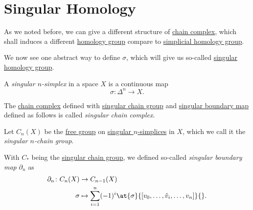 \section{Singular Homology}
As we noted before, we can give a different structure of \hyperref[def:chain-complex]{chain complex}, which shall induces a different \hyperref[def:homology-group]{homology group} compare to \hyperref[def:simplicial-homology-group]{simplicial homology group}.

We now see one abstract way to define \(\sigma \), which will give us so-called \hyperref[def:singular-homology-group]{singular homology group}.

\begin{definition}\label{def:singular-simplex}
	A \emph{singular \(n\)-simplex} in a space \(X\) is a continuous map
	\[
		\sigma \colon \Delta^n \to X.
	\]
\end{definition}

\begin{definition}\label{def:singular-chain-complex}
	The \hyperref[def:chain-complex]{chain complex} defined with \hyperref[def:singular-chain-group]{singular chain group} and \hyperref[def:singular-boundary-map]{singular boundary map} defined as follows is called \emph{singular chain complex}.
	\begin{definition}\label{def:singular-chain-group}
		Let \(C_n(X)\) be the \hyperref[def:free-group]{free group} on \hyperref[def:singular-simplex]{singular \(n\)-simplices} in \(X\), which we
		call it the \emph{singular \(n\)-chain group}.
	\end{definition}
	\begin{definition}\label{def:singular-boundary-map}
		With \(C_\ast\) being the \hyperref[def:singular-chain-group]{singular chain group}, we defined so-called \emph{singular boundary map} \(\partial _n\) as
		\[
			\begin{split}
				\partial_n \colon C_n(X) & \to C_{n - 1}(X)                                                                  \\
				\sigma                   & \mapsto \sum_{i = 1}^n (-1)^i \at{\sigma}{[v_0, \dots, \hat{v}_i, \dots, v_n]}{}.
			\end{split}
		\]
	\end{definition}
\end{definition}


